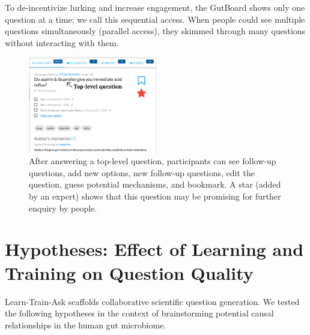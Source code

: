 To de-incentivize lurking and increase engagement, the GutBoard shows only one question at a time; we call this sequential access. When people could see multiple questions simultaneously (parallel access), they skimmed through many questions without interacting with them. 


\begin{figure}[h]
  \centering
  \includegraphics[width=0.5\textwidth]{figures/docent/fig-4.png}
  \caption[Participants can see follow-up questions, add new options, new follow-up questions, edit the question, guess potential mechanisms, and bookmark]
{After answering a top-level question, participants can see follow-up questions, add new options, new follow-up questions, edit the question, guess potential mechanisms, and bookmark. A star (added by an expert) shows that this question may be promising for further enquiry by people.}
  \label{fig:docent-4}
\end{figure}

\section{Hypotheses: Effect of Learning and Training on Question Quality}
Learn-Train-Ask scaffolds collaborative scientific question generation. We tested the following hypotheses in the context of brainstorming potential causal relationships in the human gut microbiome.

